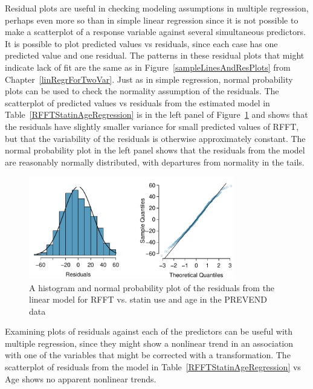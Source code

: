Residual plots are useful in checking modeling assumptions in multiple
regression, perhaps even more so than in simple linear regression since
it is not possible to make a scatterplot of a response variable against
several simultaneous predictors.  It is possible to plot predicted
values vs residuals, since each case has one predicted value and one
residual. The patterns in these residual plots that might indicate lack
of fit are the same as in Figure~\ref{sampleLinesAndResPlots} from
Chapter~\ref{linRegrForTwoVar}. Just as in simple regression, normal
probability plots can be used to check the normality assumption of the
residuals.  The scatterplot of predicted values vs residuals from the
estimated model in Table~\ref{RFFTStatinAgeRegression} is in the left
panel of Figure~\ref{statinAgeResidNormPlot} and shows that the
residuals have slightly smaller variance for small predicted values of
RFFT, but that the variability of the residuals is otherwise
approximately constant.  The normal probability plot in the left panel
shows that the residuals from the model are reasonably normally
distributed, with departures from normality in the tails.


\begin{figure}[h!]
	\centering
	\includegraphics[width=0.8\textwidth]
	{ch_multiple_linear_regression_oi_biostat/figures/statinAgeResidNormPlot/statinAgeResidNormPlot.pdf}
	\caption{A histogram and normal probability plot of the residuals from the linear model for RFFT vs. statin use and age in the PREVEND data}
	\label{statinAgeResidNormPlot}
\end{figure}


Examining plots of residuals against each of the predictors can be useful with multiple regression, since they might show a nonlinear trend in an association with one of the variables that might be corrected with a transformation.  The scatterplot of residuals from the model in Table~\ref{RFFTStatinAgeRegression} vs Age shows no apparent nonlinear trends.  


